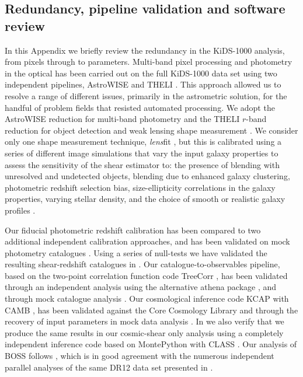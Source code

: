 \begin{appendix}
\section{Redundancy, pipeline validation and software review}
\label{app:codereview}

In this Appendix we briefly review the redundancy in the KiDS-1000 analysis, from pixels through to parameters.   Multi-band pixel processing and photometry in the optical has been carried out on the full KiDS-1000 data set using two independent pipelines, {\sc AstroWISE} and {\sc THELI} \citep{begeman/etal:2013, erben/etal:2013}.  This approach allowed us to resolve a range of different issues, primarily in the astrometric solution, for the handful of problem fields that resisted automated processing.  We adopt the {\sc AstroWISE} reduction for multi-band photometry and the {\sc THELI} $r$-band reduction for object detection and weak lensing shape measurement \citep{kuijken/etal:2019}.  We consider only one shape measurement technique, {\it lens}fit \citep{miller/etal:2013}, but this is calibrated using a series of different image simulations that vary the input galaxy properties to assess the sensitivity of the shear estimator to: the presence of blending with unresolved and undetected objects, blending due to enhanced galaxy clustering, photometric redshift selection bias, size-ellipticity correlations in the galaxy properties, varying stellar density, and the choice of smooth or realistic galaxy profiles \citep[see][for details]{kannawadi/etal:2019, giblin/etal:inprep}.  

Our fiducial photometric redshift calibration has been compared to two additional independent calibration approaches, and has been validated on mock photometry catalogues \citep[see][for details]{wright/etal:2020, vandenbusch/etal:2020, hildebrandt/etal:inprep}.   Using a series of null-tests we have validated the resulting shear-redshift catalogues in \citet{giblin/etal:inprep}.    Our catalogue-to-observables pipeline, based on the two-point correlation function code {\sc TreeCorr} \citep{treecorr}, has been validated through an independent analysis using the alternative {\sc athena} package \citep{athena}, and through mock catalogue analysis \citep{joachimi/etal:inprep}.   Our cosmological inference code {\sc KCAP} with {\sc CAMB} \citep{lewis/etal:2000}, has been validated against the Core Cosmology Library \citep[CCL,][]{chisari/etal:2019} and through the recovery of input parameters in mock data analysis \citep{joachimi/etal:inprep}.  In \citet{asgari/etal:inprep} we also verify that we produce the same results in our cosmic-shear only analysis using a completely independent inference code based on {\sc MontePython} with {\sc CLASS} \citep{class, montepython, kohlinger/etal:2019,hildebrandt/etal:2020}.   Our analysis of BOSS follows \citet{sanchez/etal:2017}, which is in good agreement with the numerous independent parallel analyses of the same DR12 data set presented in \citet{alam/etal:2017}.



\end{appendix}
